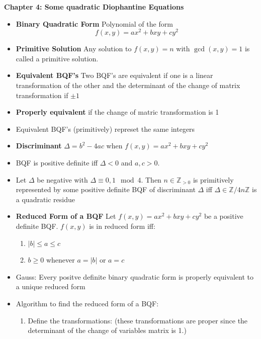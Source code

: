 \documentclass[a4paper, 12pt]
{article}
\begin{document}
	\textbf{Chapter 4: Some quadratic Diophantine Equations}
	
	\begin{itemize}
		\item \textbf{Binary Quadratic Form} Polynomial of the form
		$$f(x,y) = ax^2 + bxy + cy^2$$
		
		\item \textbf{Primitive Solution} Any solution to $f(x,y)=n$ with $\gcd(x,y)=1$ is called a primitive solution.
		
		\newpage
		
		\item \textbf{Equivalent BQF's} Two BQF's are equivalent if one is a linear transformation of the other and the determinant of the change of matrix transformation if $\pm 1$
		
		\item \textbf{Properly equivalent} if the change of matric transformation is 1
		
		\item Equivalent BQF's (primitively) represet the same integers
		
		\item \textbf{Discriminant} $\Delta = b^2 - 4ac$ when $f(x,y)= ax^2 + bxy +cy^2$
		
		\item BQF is positive definite iff $\Delta <0$ and $a,c>0.$
		
		\item Let $\Delta$ be negative with $\Delta \equiv 0,1 \mod 4.$ Then $n \in \mathbb{Z}_{>0}$ is primitively represented by some positive definite BQF of discriminant $\Delta$ iff $\Delta \in \mathbb{Z}/4n\mathbb{Z}$ is a quadratic residue
				
		\item \textbf{Reduced Form of a BQF} Let $f(x,y)= ax^2 + bxy +cy^2$ be a positive definite BQF. $f(x,y)$ is in reduced form iff:
		\begin{enumerate}
			\item $|b| \leq a \leq c$
			\item $b \geq 0$ whenever $a=|b|$ or $a=c$ 
		\end{enumerate} 
		
		
		\item Gauss: Every positve definite binary quadratic form is properly equivalent to a unique reduced form 
		
		\item Algorithm to find the reduced form of a BQF:
		\begin{enumerate}
			\item Define the transformations: (these transformations are proper since the determinant of the change of variables matrix is 1.)
			

\end{enumerate}
\end{itemize}
\end{document}
